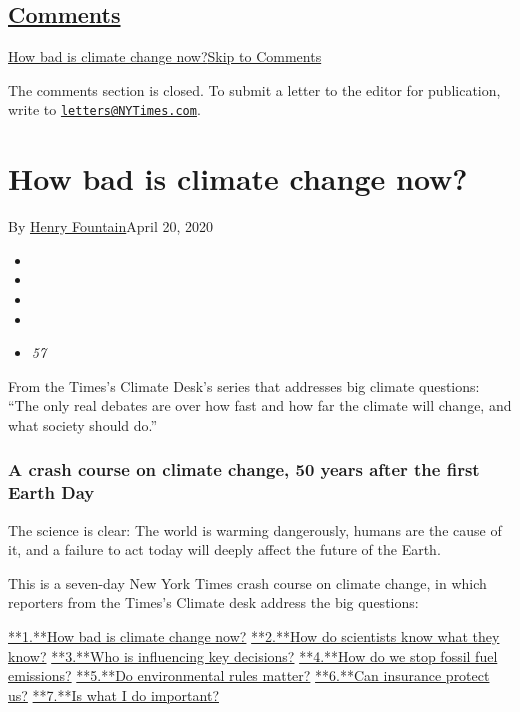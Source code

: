 \hypertarget{comments}{%
\subsection{\texorpdfstring{\protect\hyperlink{commentsContainer}{Comments}}{Comments}}\label{comments}}

\href{}{How bad is climate change now?}\href{}{Skip to Comments}

The comments section is closed. To submit a letter to the editor for
publication, write to
\href{mailto:letters@NYTimes.com}{\nolinkurl{letters@NYTimes.com}}.

\hypertarget{how-bad-is-climate-change-now}{%
\section{How bad is climate change
now?}\label{how-bad-is-climate-change-now}}

By \href{https://www.nytimes3xbfgragh.onion/by/henry-fountain}{Henry
Fountain}April 20, 2020

\begin{itemize}
\item
\item
\item
\item
\item
  \emph{57}
\end{itemize}

From the Times's Climate Desk's series that addresses big climate
questions: ``The only real debates are over how fast and how far the
climate will change, and what society should do.''

\hypertarget{a-crash-course-on-climate-change-50-years-after-the-first-earth-day}{%
\subsubsection{A crash course on climate change, 50 years after the
first Earth
Day}\label{a-crash-course-on-climate-change-50-years-after-the-first-earth-day}}

The science is clear: The world is warming dangerously, humans are the
cause of it, and a failure to act today will deeply affect the future of
the Earth.

This is a seven-day New York Times crash course on climate change, in
which reporters from the Times's Climate desk address the big questions:

\href{/interactive/2020/04/19/climate/climate-crash-course-1.html}{**1.**How
bad is climate change now?}
\href{/interactive/2020/04/19/climate/climate-crash-course-2.html}{**2.**How
do scientists know what they know?}
\href{/interactive/2020/04/19/climate/climate-crash-course-3.html}{**3.**Who
is influencing key decisions?}
\href{/interactive/2020/04/19/climate/climate-crash-course-4.html}{**4.**How
do we stop fossil fuel emissions?}
\href{/interactive/2020/04/19/climate/climate-crash-course-5.html}{**5.**Do
environmental rules matter?}
\href{/interactive/2020/04/19/climate/climate-crash-course-6.html}{**6.**Can
insurance protect us?}
\href{/interactive/2020/04/19/climate/climate-crash-course-7.html}{**7.**Is
what I do important?}

